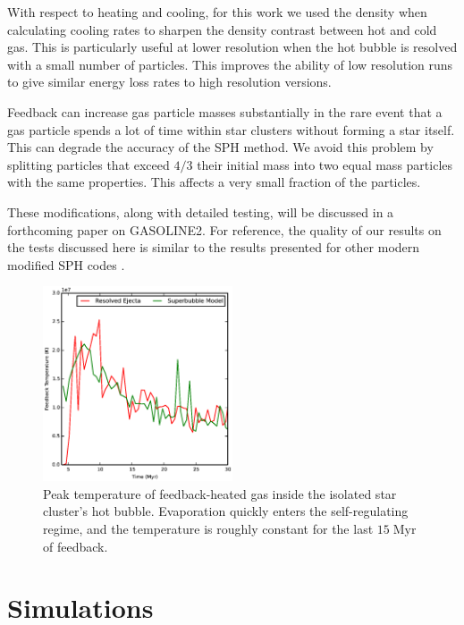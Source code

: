 {With respect to heating and cooling, for this work we used the
\citet{Ritchie2001} density when calculating cooling rates to sharpen the
density contrast between hot and cold gas.  This is particularly useful at lower
resolution when the hot bubble is resolved with a small number of particles.
This improves the ability of low resolution runs to give similar energy loss
rates to high resolution versions.
 
Feedback can increase gas particle masses substantially in the rare event that a
gas particle spends a lot of time within star clusters without forming a star
itself.  This can degrade the accuracy of the SPH method.  We avoid this problem
by splitting particles that exceed $4/3$ their initial mass into two equal mass
particles with the same properties.  This affects a very small fraction of the
particles.

These modifications, along with detailed testing, will be discussed in a
forthcoming paper on {\sc GASOLINE2}.  For reference, the quality of our results
on the tests discussed here is similar to the results presented for other modern
modified SPH codes \citep[e.g.][]{Hopkins2013}.   }

\begin{figure}
    \includegraphics[width=0.5\textwidth]{figures1/onestar_hottemp.eps}
    \caption[Peak temperature of feedback-heated gas in a superbubble]{Peak
    temperature of feedback-heated gas inside the isolated star cluster's hot
    bubble.  Evaporation quickly enters the self-regulating regime, and the
    temperature is roughly constant for the last $15\;\mathrm{Myr}$ of
    feedback.}
    \label{onestar_hottemp}
\end{figure}


\section{Simulations}
